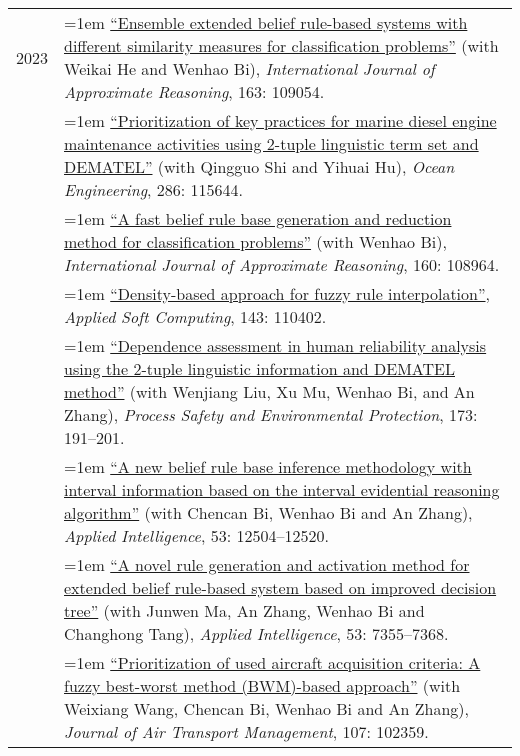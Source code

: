 \documentclass[11pt,english]{article}
\begin{document}
\begin{tabular}{p{.85in}>{\hangindent=1em}p{5.65in}<{\raggedright}}
2023 &  \href{https://doi.org/10.1016/j.ijar.2023.109054}{``Ensemble extended belief rule-based systems with different similarity measures for classification problems''} (with Weikai He and Wenhao Bi), \textit{International Journal of Approximate Reasoning}, 163: 109054. \\

 &  \href{https://doi.org/10.1016/j.oceaneng.2023.115644}{``Prioritization of key practices for marine diesel engine maintenance activities using 2-tuple linguistic term set and DEMATEL''} (with Qingguo Shi and Yihuai Hu), \textit{Ocean Engineering}, 286: 115644. \\

 &  \href{https://doi.org/10.1016/j.ijar.2023.108964}{``A fast belief rule base generation and reduction method for classification problems''} (with Wenhao Bi), \textit{International Journal of Approximate Reasoning}, 160: 108964. \\

 &  \href{https://doi.org/10.1016/j.asoc.2023.110402}{``Density-based approach for fuzzy rule interpolation''}, \textit{Applied Soft Computing}, 143: 110402. \\

 &  \href{https://doi.org/10.1016/j.psep.2023.03.026}{``Dependence assessment in human reliability analysis using the 2-tuple linguistic information and DEMATEL method''} (with Wenjiang Liu, Xu Mu, Wenhao Bi, and An Zhang), \textit{Process Safety and Environmental Protection}, 173: 191--201. \\

 &  \href{https://doi.org/10.1007/s10489-022-04182-z}{``A new belief rule base inference methodology with interval information based on the interval evidential reasoning algorithm''} (with Chencan Bi, Wenhao Bi and An Zhang), \textit{Applied Intelligence}, 53: 12504--12520. \\

 &  \href{https://doi.org/10.1007/s10489-022-03803-x}{``A novel rule generation and activation method for extended belief rule-based system based on improved decision tree''} (with Junwen Ma, An Zhang, Wenhao Bi and Changhong Tang), \textit{Applied Intelligence}, 53: 7355--7368. \\

 &  \href{https://doi.org/10.1016/j.jairtraman.2023.102359}{``Prioritization of used aircraft acquisition criteria: A fuzzy best-worst method (BWM)-based approach''} (with Weixiang Wang, Chencan Bi, Wenhao Bi and An Zhang), \textit{Journal of Air Transport Management}, 107: 102359. \\
 

\end{tabular}
\end{document}
